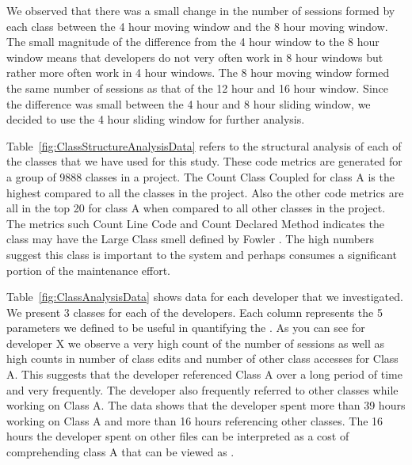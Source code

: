 We observed that there was a small change in the number of sessions formed by each class between the 4 hour moving window and the 8 hour moving window. The small magnitude of the difference from the 4 hour window to the 8 hour window means that developers do not very often work in 8 hour windows but rather more often work in 4 hour windows. The 8 hour moving window formed the same number of sessions as that of the 12 hour and 16 hour window. Since the difference was small between the 4 hour and 8 hour sliding window, we decided to use the 4 hour sliding window for further analysis.

Table~\ref{fig:ClassStructureAnalysisData} refers to the structural analysis of each of the classes that we have used for this study.  These code metrics are generated for a group of 9888 classes in a project. The Count Class Coupled for class A is the highest compared to all the classes in the project. Also the other code metrics are all in the top 20  for class A when compared to all other classes in the project. The metrics such Count Line Code and Count Declared Method indicates the class may have the Large Class smell defined by Fowler \cite{Fowler_etal:1999}.   The high numbers suggest this class is important to the system and perhaps consumes a significant portion of the maintenance effort. 

Table~\ref{fig:ClassAnalysisData} shows data for each developer that we investigated. We present 3 classes for each of the developers. Each column represents the 5 parameters we defined to be useful in quantifying the \TD. As you can see for developer X we observe a very high count of the number of sessions as well as high counts in number of class edits and number of other class accesses for Class A. This suggests that the developer referenced Class A over a long period of time and very frequently. The developer also frequently referred to other classes while working on Class A. The data shows that the developer spent more than 39 hours working on Class A and more than 16 hours referencing other classes. The 16 hours the developer spent on other files can be interpreted as a cost of comprehending class A that can be viewed as  \TD. 

